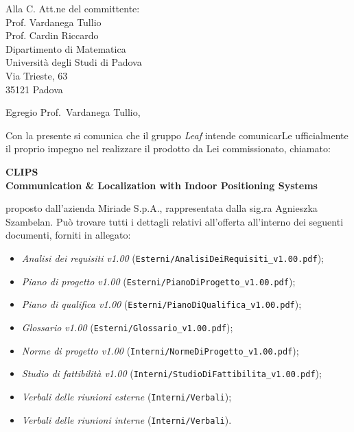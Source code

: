 \documentclass[a4paper,12pt]{letteracdp}
\author{Federico Tavella}
\date{21 gennaio 2016}
\begin{document}
	\begin{letter}{
		Alla C. Att.ne del committente: \\
		Prof. Vardanega Tullio \\
		Prof. Cardin Riccardo \\
		Dipartimento di Matematica \\
		Università degli Studi di Padova \\
		Via Trieste, 63 \\
		35121 Padova}
		
		\opening{Egregio Prof.~Vardanega Tullio,}
		Con la presente si comunica che il gruppo \textit{Leaf} intende comunicarLe ufficialmente il proprio impegno nel realizzare il prodotto da Lei commissionato, chiamato:
\begin{center}
	\textbf{CLIPS \\ Communication \& Localization with Indoor Positioning Systems}
\end{center}
proposto dall'azienda Miriade S.p.A., rappresentata dalla sig.ra Agnieszka Szambelan.
Può trovare tutti i dettagli relativi all'offerta all'interno dei seguenti documenti, forniti in allegato:

\begin{itemize}
	\item \textit{Analisi dei requisiti v1.00} (\texttt{Esterni/AnalisiDeiRequisiti\_v1.00.pdf});

	\item \textit{Piano di progetto v1.00} (\texttt{Esterni/PianoDiProgetto\_v1.00.pdf});

	\item \textit{Piano di qualifica v1.00} (\texttt{Esterni/PianoDiQualifica\_v1.00.pdf});
	
	\item \textit{Glossario v1.00} (\texttt{Esterni/Glossario\_v1.00.pdf});
	
	\item \textit{Norme di progetto v1.00} (\texttt{Interni/NormeDiProgetto\_v1.00.pdf});

	\item \textit{Studio di fattibilità v1.00} (\texttt{Interni/StudioDiFattibilita\_v1.00.pdf});

	\item \textit{Verbali delle riunioni esterne}	(\texttt{Interni/Verbali});
	
	\item \textit{Verbali delle riunioni interne} (\texttt{Interni/Verbali}).
	

\end{itemize}
\end{letter}
\end{document}
